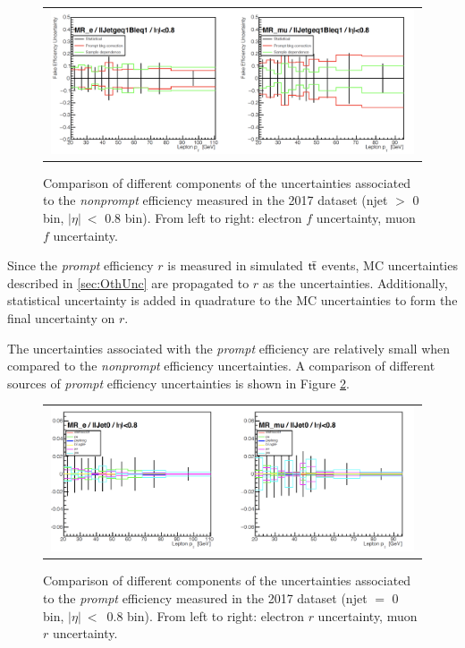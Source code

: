 \begin{figure}[tbh!]
 \begin{center}
 \begin{tabular}{c}
 \includegraphics[width=0.99\textwidth]{figures/Part3/Systematics/MR2}
 \end{tabular}
 \caption{Comparison of different components of the uncertainties associated to the \emph{nonprompt} efficiency measured in the 2017 dataset (njet $>$ 0 bin, $|\eta|~<$ 0.8 bin). From left to right: electron $f$ uncertainty, muon $f$ uncertainty.}
 \label{fig:f_comp2}
 \end{center}
\end{figure}

Since the \emph{prompt} efficiency $r$ is measured in simulated $\textsf{t}\overline{\textsf{t}}$ events, \ac{MC} uncertainties described in \autoref{sec:OthUnc} are propagated to $r$ as the uncertainties. Additionally, statistical uncertainty is added in quadrature to the MC uncertainties to form the final uncertainty on $r$.

The uncertainties associated with the \emph{prompt} efficiency are relatively small when compared to the \emph{nonprompt} efficiency uncertainties. A comparison of different sources of \emph{prompt} efficiency uncertainties is shown in Figure \ref{fig:r_comp}.

\begin{figure}[tbh!]
 \begin{center}
 \begin{tabular}{c}
 \includegraphics[width=0.99\textwidth]{figures/Part3/Systematics/MR}
 \end{tabular}
 \caption{Comparison of different components of the uncertainties associated to the \emph{prompt} efficiency measured in the 2017 dataset (njet $=$ 0 bin, $|\eta|~<$~0.8 bin). From left to right: electron $r$ uncertainty, muon $r$ uncertainty.}
 \label{fig:r_comp}
 \end{center}
\end{figure}

